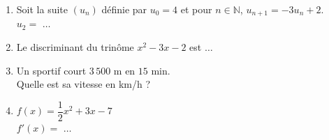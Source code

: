 \documentclass[a4paper,11pt,landscape,exos]{nsi} %
\begin{document}
\begin{multicols}{2}
\begin{enumerate}[itemsep=1em]
\begin{tikzpicture}[baseline,scale = 0.6]
\end{tikzpicture}\\
	\item Soit la suite $(u_n)$ définie  par $u_0 = 4$ et pour $n \in \mathbb{N}$, 
    $u_{n+1} = -3u_n +2$.\\
    $u_2=$ $\ldots$
	\item Le discriminant du trinôme $x^2-3x-2$ est  $\ldots$
	\item Un sportif court $3\,500$ m  en $15$ min.\\
      Quelle est sa vitesse en km/h ?
	\item $f(x)=\dfrac{1}{2}x^2+3x-7$\\
    $f'(x)=$ $\ldots$
	

\end{enumerate}
\end{multicols}
\end{document}
